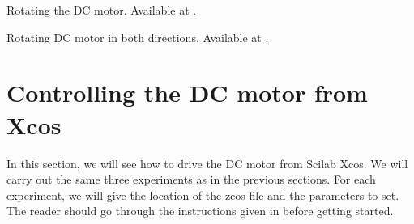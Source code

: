 \begin{scicode}
  {Rotating the DC motor.  Available at
    .}
  \label{sci:dcmotor-clock}
  
\end{scicode}

\begin{scicode}
  {Rotating DC motor in both directions.  Available at
    .}
  \label{sci:dcmotor-both}
  
\end{scicode}

\begin{scicode}
  \label{sci:dcmotor-loop}
  
\end{scicode}

\section{Controlling the DC motor from Xcos}
In this section, we will see how to drive the DC motor from Scilab Xcos. 
We will carry out the same three experiments as in the previous
sections. For each experiment, we will give the location of the zcos file and the
parameters to set.  The reader should go through the instructions
given in  before getting started.  



